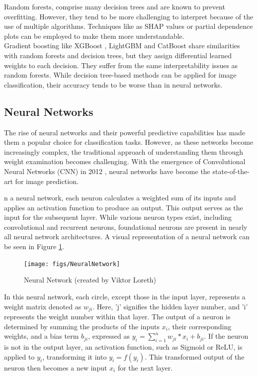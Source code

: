Random forests, comprise many decision trees and are known to prevent overfitting. However, they tend to be more challenging to interpret because of the use of multiple algorithms. Techniques like as SHAP values \cite{lundberg2017unified} or partial dependence plots \cite{PDP} can be employed to make them more understandable.
\\
Gradient boosting like XGBoost \cite{Chen_2016}, LightGBM \cite{Ke2017} and CatBoost \cite{prokhorenkova2019catboost} share similarities with random forests and decision trees, but they assign differential learned weights to each decision. They suffer from the same interpretability issues as random forests. While decision tree-based methods can be applied for image classification, their accuracy tends to be worse than in neural networks.


\subsection{Neural Networks}

The rise of neural networks and their powerful predictive capabilities has made them a popular choice for classification tasks. However, as these networks become increasingly complex, the traditional approach of understanding them through weight examination becomes challenging. With the emergence of Convolutional Neural Networks (CNN) in 2012 \cite{krizhevsky2012nn}, neural networks have become the state-of-the-art for image prediction.

n a neural network, each neuron calculates a weighted sum of its inputs and applies an activation function to produce an output. This output serves as the input for the subsequent layer. While various neuron types exist, including convolutional and recurrent neurons, foundational neurons are present in nearly all neural network architectures. A visual representation of a neural network can be seen in Figure \ref{fig:Neural_Network}.

\begin{figure}[h!]
	\centering
	\texttt{[image: figs/NeuralNetwork]}
	\caption[Neural Network]{Neural Network (created by Viktor Loreth)} 
	\label{fig:Neural_Network}
\end{figure}

In this neural network, each circle, except those in the input layer, represents a weight matrix denoted as $w_{ji}$. Here, 'j' signifies the hidden layer number, and 'i' represents the weight number within that layer. The output of a neuron is determined by summing the products of the inputs $x_i$, their corresponding weights, and a bias term $b_{ji}$, expressed as $y_i = \sum_{i=1}^{n} w_{ji} \ast x_i + b_{ji}$. If the neuron is not in the output layer, an activation function, such as Sigmoid or ReLU, is applied to $y_i$, transforming it into $y_i = f(y_i)$. This transformed output of the neuron then becomes a new input $x_i$ for the next layer.

